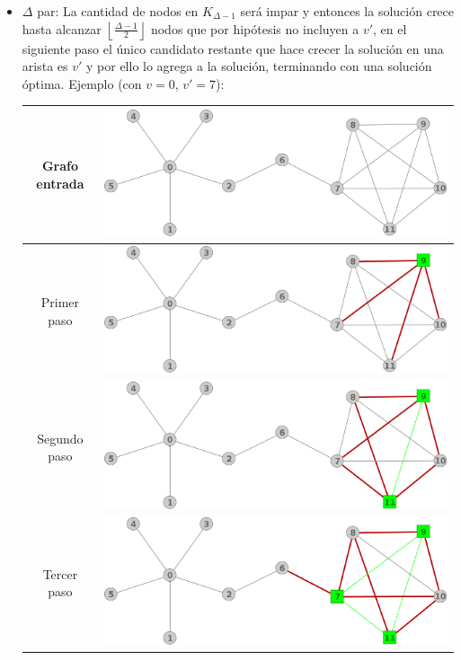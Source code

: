 \begin{itemize}
	\item $\Delta$ par: La cantidad de nodos en $K_{\Delta -1}$ ser\'a impar 
	y entonces la soluci\'on crece hasta alcanzar
	$\left\lfloor \frac{\Delta -1}{2} \right\rfloor$ nodos que por hip\'otesis
	no incluyen a $v'$, en el siguiente paso el \'unico candidato restante
	que hace crecer la soluci\'on en una arista es $v'$ y por ello lo agrega 
	a la soluci\'on, terminando con una soluci\'on \'optima.
	Ejemplo (con $v = 0$, $v' = 7$):
	\begin{center}
	\begin{tabular}{|c||c|}
		\hline
		Grafo entrada & 
		\includegraphics[scale = 0.2]{img/ej3/busqueda_local/estrellaPuenteCMFImpar.png} \\
		\hline
		Primer paso &
		\includegraphics[scale = 0.2]{img/ej3/busqueda_local/estrellaPuenteCMFImpar_st01.png} \\
		\hline
		Segundo paso &
		\includegraphics[scale = 0.2]{img/ej3/busqueda_local/estrellaPuenteCMFImpar_st02.png} \\
		\hline
		Tercer paso &
		\includegraphics[scale = 0.2]{img/ej3/busqueda_local/estrellaPuenteCMFImpar_st03.png} \\
		\hline


\end{tabular}
\end{center}
\end{itemize}
